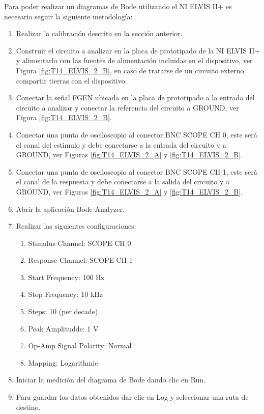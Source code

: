 	Para poder realizar un diagramas de Bode utilizando el NI ELVIS II+ es necesario seguir la siguiente metodología:
		
		\begin{enumerate}
			\item Realizar la calibración descrita en la sección anterior.
			\item Construir el circuito a analizar en la placa de prototipado de la NI ELVIS II+ y alimentarlo con las fuentes de alimentación incluidas en el dispositivo, ver Figura \ref{fig:T14_ELVIS_2_B}, en caso de tratarse de un circuito externo compartir tierras con el dispositivo. 
			\item Conectar la señal FGEN ubicada en la placa de prototipado a la entrada del circuito a analizar y conectar la referencia del circuito a GROUND, ver Figura \ref{fig:T14_ELVIS_2_B}.
			\item Conectar una punta de osciloscopio al conector BNC SCOPE CH 0, este será el canal del estimulo y debe conectarse a la entrada del circuito y a GROUND, ver Figuras \ref{fig:T14_ELVIS_2_A} y \ref{fig:T14_ELVIS_2_B}.
			\item Conectar una punta de osciloscopio al conector BNC SCOPE CH 1, este será el canal de la respuesta y debe conectarse a la salida del circuito y a GROUND, ver Figuras \ref{fig:T14_ELVIS_2_A} y \ref{fig:T14_ELVIS_2_B}.
			\item Abrir la aplicación Bode Analyzer.
			\item Realizar las siguientes configuraciones:
				\begin{multicols}{2}
				    \begin{enumerate}
				    	\item Stimulus Channel: SCOPE CH 0
						\item Response Channel: SCOPE CH 1 
						\item Start Frequency:	100 Hz
						\item Stop Frequency:	10 kHz
						\item Steps:			10 (per decade)
						\item Peak Amplitudde:	1 V
						\item Op-Amp Signal Polarity: Normal
						\item Mapping:			Logarithmic
				    \end{enumerate}
			    \end{multicols}
		    \item Iniciar la medición del diagrama de Bode dando clic en Run.
		    \item Para guardar los datos obtenidos dar clic en Log y seleccionar una ruta de destino.
		\end{enumerate}
	
